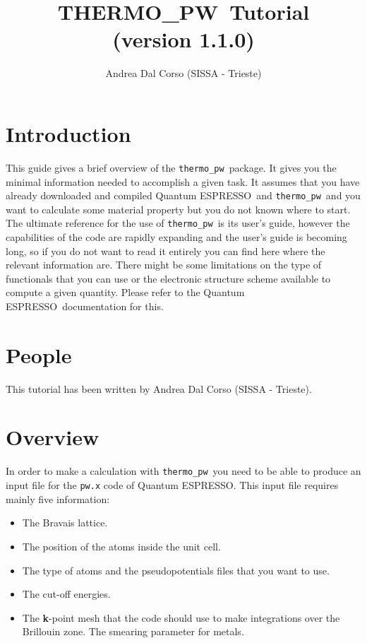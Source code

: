 \documentclass[12pt,a4paper]{article}
\def\version{1.1.0}
\def\qe{{\sc Quantum ESPRESSO}}
\def\tpw{{\sc THERMO\_PW}}
\def\thermo{\texttt{thermo\_pw}}
\begin{document}
 
\author{Andrea Dal Corso (SISSA - Trieste)}
\date{}


\title{
  \vskip 1cm
  {\color{red} \Huge \tpw\ Tutorial} \\
  \Large (version \version)
}

\maketitle

\tableofcontents

\newpage

\section{\color{coral}Introduction}

This guide gives a brief overview of the \thermo\ package. 
It gives you the minimal information needed to accomplish a given task.
It assumes that you have already downloaded and compiled \qe\ and \thermo\  
and you want to calculate some material property but you do not known where 
to start. 
The ultimate reference for the use of \thermo\ is its user's guide,
however the capabilities of the code are rapidly expanding and the 
user's guide is becoming long, so if you do not want
to read it entirely you can find here where the relevant information are.
There might be some limitations on the type of functionals that you can use 
or the electronic structure scheme available to compute a given quantity.
Please refer to the \qe\ documentation for this.

\section{\color{coral}People}
This tutorial has been written by Andrea Dal Corso (SISSA - Trieste). 

\section{\color{coral}Overview}

In order to make a calculation with \thermo\ you need to be able to 
produce an input file for the \texttt{pw.x} code of \qe. This input file
requires mainly five information:
\begin{itemize}
\item The Bravais lattice.

\item The position of the atoms inside the unit cell.

\item The type of atoms and the pseudopotentials files that you want to use.

\item The cut-off energies.

\item The {\bf k}-point mesh that the code should use to make integrations over
the Brillouin zone. The smearing parameter for metals. 
\end{itemize}
\end{document}
